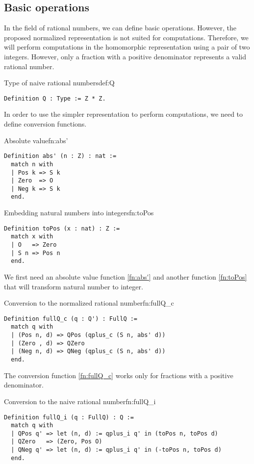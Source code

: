 \subsection{Basic operations}
In the field of rational numbers, we can define basic operations. However, the proposed normalized representation is not suited for computations. Therefore, we will perform computations in the homomorphic representation using a pair of two integers. However, only a fraction with a positive denominator represents a valid rational number.
\begin{defi}{Type of naive rational numbers}{def:Q}
\begin{verbatim}
Definition Q : Type := Z * Z.
\end{verbatim}
\end{defi}
In order to use the simpler representation to perform computations, we need to define conversion functions.
\begin{func}{Absolute value}{fn:abs'}
\begin{verbatim}
Definition abs' (n : Z) : nat :=
  match n with
  | Pos k => S k
  | Zero  => O
  | Neg k => S k
  end.
\end{verbatim}
\end{func}
\begin{func}{Embedding natural numbers into integers}{fn:toPos}
\begin{verbatim}
Definition toPos (x : nat) : Z :=
  match x with
  | O   => Zero
  | S n => Pos n
  end.
\end{verbatim}
\end{func}
We first need an absolute value function \ref{fn:abs'} and another function \ref{fn:toPos} that will transform natural number to integer.
\begin{func}{Conversion to the normalized rational number}{fn:fullQ_c}
\begin{verbatim}
Definition fullQ_c (q : Q') : FullQ :=
  match q with
  | (Pos n, d) => QPos (qplus_c (S n, abs' d))
  | (Zero , d) => QZero
  | (Neg n, d) => QNeg (qplus_c (S n, abs' d))
  end.
\end{verbatim}
\end{func}
The conversion function \ref{fn:fullQ_c} works only for fractions with a positive denominator.
\begin{func}{Conversion to the naive rational number}{fn:fullQ_i}
\begin{verbatim}
Definition fullQ_i (q : FullQ) : Q :=
  match q with
  | QPos q' => let (n, d) := qplus_i q' in (toPos n, toPos d)
  | QZero   => (Zero, Pos O)
  | QNeg q' => let (n, d) := qplus_i q' in (-toPos n, toPos d)
  end.
\end{verbatim}
\end{func}
